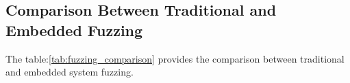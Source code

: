 

\subsection{Comparison Between Traditional and Embedded Fuzzing}

The table:\ref{tab:fuzzing_comparison} provides the comparison between traditional
and embedded system fuzzing\cite{yun2022fuzzing}\cite{9742291}.

